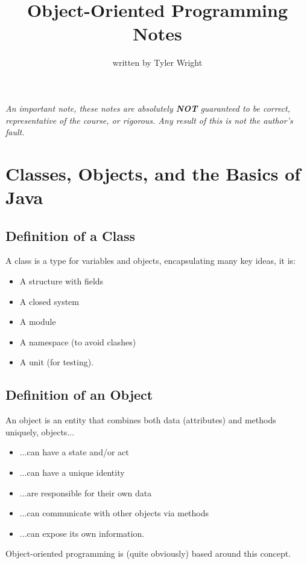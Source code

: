 \documentclass[a4paper, 12pt, twoside]{article}
\begin{document}
\title{Object-Oriented Programming Notes}
\date{}
\author{written by Tyler Wright}
\maketitle

\vfill

\textit{An important note, these notes are absolutely \textbf{NOT}
      guaranteed to be correct, representative of the course, or rigorous.
      Any result of this is not the author's fault.}

\newpage

\section{Classes, Objects, and the Basics of Java}

\subsection{Definition of a Class}

A class is a type for variables and objects, encapsulating many key
ideas, it is:
\begin{itemize}
    \item A structure with fields
    \item A closed system
    \item A module
    \item A namespace (to avoid clashes)
    \item A unit (for testing).
\end{itemize}

\subsection{Definition of an Object}

An object is an entity that combines both data (attributes) and
methods uniquely, objects...
\begin{itemize}
    \item ...can have a state and/or act
    \item ...can have a unique identity
    \item ...are responsible for their own data
    \item ...can communicate with other objects via methods
    \item ...can expose its own information.
\end{itemize}
Object-oriented programming is (quite obviously) based around this
concept.
\end{document}
